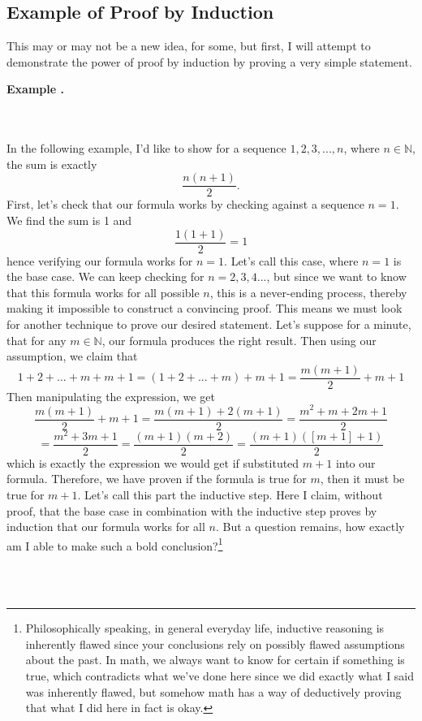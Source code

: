 \documentclass[11pt]{article}
\numberwithin{lemma}{section}
\numberwithin{equation}{section}
\numberwithin{define}{section}
\numberwithin{prop}{section}
\numberwithin{figure}{section}
\numberwithin{theorem}{section}
\newcounter{ex}[section]
\newenvironment{ex}[0]{

	\refstepcounter{ex}
	\begin{large}
    \textbf{Example \theex .}
    \end{large}\\\\
    }
    {
    \\\\
    }
\numberwithin{ex}{section}
\def\nat{\mathbb{N}}
\begin{document}
\subsection{Example of Proof by Induction}
This may or may not be a new idea, for some, but first, I will attempt to demonstrate the power of proof by induction by proving a very simple statement.
\begin{ex}
In the following example, I'd like to show for a sequence $1,2,3,...,n$, where $n\in\nat$, the sum is exactly
$$\frac{n(n+1)}{2}.$$
First, let's check that our formula works by checking against a sequence $n=1$. We find the sum is 1 and
$$\frac{1(1+1)}{2}=1$$
hence verifying our formula works for $n=1$. Let's call this case, where $n=1$ is the base case. We can keep checking for $n=2,3,4...$, but since we want to know that this formula works for all possible $n$, this is a never-ending process, thereby making it impossible to construct a convincing proof.
This means we must look for another technique to prove our desired statement. Let's suppose for a minute, that for any $m\in\nat$, our formula produces the right result. Then using our assumption, we claim that
$$1+2+...+m+m+1=(1+2+...+m)+m+1=\frac{m(m+1)}{2}+m+1$$
Then manipulating the expression, we get
$$\frac{m(m+1)}{2}+m+1=\frac{m(m+1)+2(m+1)}{2}=\frac{m^2+m+2m+1}{2}$$
$$=\frac{m^2+3m+1}{2}=\frac{(m+1)(m+2)}{2}=\frac{(m+1)([m+1]+1)}{2}$$
which is exactly the expression we would get if substituted $m+1$ into our formula. Therefore, we have proven if the formula is true for $m$, then it must be true for $m+1$. Let's call this part the inductive step.
Here I claim, without proof, that the base case in combination with the inductive step proves by induction that our formula works for all $n$.
But a question remains, how exactly am I able to make such a bold conclusion?\footnote{Philosophically speaking, in general everyday life, inductive reasoning is inherently flawed since your conclusions rely on possibly flawed assumptions about the past. 
In math, we always want to know for certain if something is true, which contradicts what we've done here since we did exactly what I said was inherently flawed, but somehow math has a way of deductively proving that what I did here in fact is okay.}
\end{ex}
\end{document}
